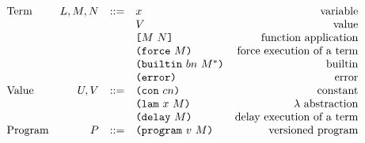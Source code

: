 \documentclass[../plutus-core-specification.tex]{subfiles}
\begin{document}
\begin{minipage}{\linewidth}
    \centering
    \[\begin{array}{lrclr}
    \textrm{Term}       & L,M,N  & ::= & x                          & \textrm{variable}\\
                        &        &     & V                          & \textrm{value}\\
                        &        &     & \texttt{[} M ~ N \texttt{]}                & \textrm{function application}\\
                        &        &     & \texttt{(} \texttt{force} ~ M \texttt{)}                  & \textrm{force execution of a term}\\
                        &        &     & \texttt{(} \texttt{builtin} ~ bn ~ M^* \texttt{)}         & \textrm{builtin}\\
                        &        &     & \texttt{(} \texttt{error} \texttt{)}                    & \textrm{error}\\
        \textrm{Value}  & U, V   & ::= & \texttt{(} \texttt{con} ~ cn \texttt{)}                   & \textrm{constant}\\
                        &        &     & \texttt{(} \texttt{lam} ~ x ~ M  \texttt{)}                & \textrm{$\lambda$ abstraction}\\
                        &        &     & \texttt{(} \texttt{delay} ~ M \texttt{)}                  & \textrm{delay execution of a term}\\
        \textrm{Program}& P      & ::= & \texttt{(} \texttt{program} ~ v ~ M \texttt{)}             & \textrm{versioned program}\\

    \end{array}\]
    \label{fig:untyped-grammar}
\end{minipage}
\end{document}
